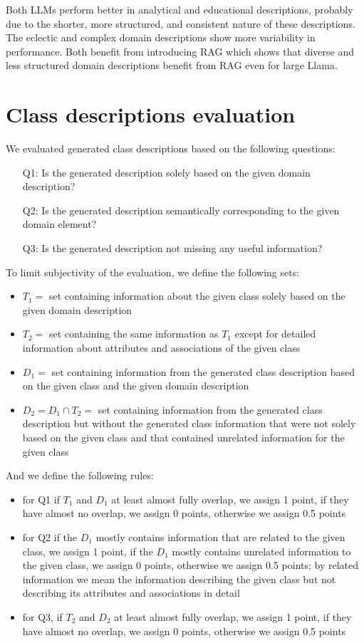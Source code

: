 Both LLMs perform better in analytical and educational descriptions, probably due to the shorter, more structured, and consistent nature of these descriptions.
The eclectic and complex domain descriptions show more variability in performance.
Both benefit from introducing RAG which shows that diverse and less structured domain descriptions benefit from RAG even for large Llama.


\section{Class descriptions evaluation}

We evaluated generated class descriptions based on the following questions:

\begin{enumerate}
\item [Q1:] Is the generated description solely based on the given domain description?
\item [Q2:] Is the generated description semantically corresponding to the given domain element?
\item [Q3:] Is the generated description not missing any useful information?
\end{enumerate}

\noindent{}To limit subjectivity of the evaluation, we define the following sets:

\begin{itemize}
\item $T_1 =$ set containing information about the given class solely based on the given domain description
\item $T_2 =$ set containing the same information as $T_1$ except for detailed information about attributes and associations of the given class
\item $D_1 =$ set containing information from the generated class description based on the given class and the given domain description
\item $D_2 = D_1 \cap T_2 =$ set containing information from the generated class description but without the generated class information that were not solely based on the given class and that contained unrelated information for the given class
\end{itemize}

\noindent{}And we define the following rules:
\begin{itemize}
\item for Q1 if $T_1$ and $D_1$ at least almost fully overlap, we assign 1 point, if they have almost no overlap, we assign 0 points, otherwise we assign 0.5 points
\item for Q2 if the $D_1$ mostly contains information that are related to the given class, we assign 1 point, if the $D_1$ mostly contains unrelated information to the given class, we assign 0 points, otherwise we assign 0.5 points; by related information we mean the information describing the given class but not describing its attributes and associations in detail
\item for Q3, if $T_2$ and $D_2$ at least almost fully overlap, we assign 1 point, if they have almost no overlap, we assign 0 points, otherwise we assign 0.5 points
\end{itemize}



